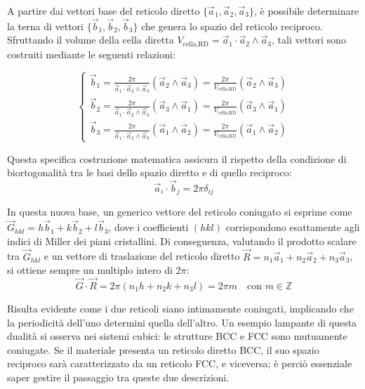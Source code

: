 A partire dai vettori base del reticolo diretto \( \{\vec{a}_1, \vec{a}_2, \vec{a}_3\} \), è possibile determinare la terna di vettori \( \{\vec{b}_1, \vec{b}_2, \vec{b}_3\} \) che genera lo spazio del reticolo reciproco. Sfruttando il volume della cella diretta \( V_{\text{cella,RD}} = \vec{a}_1 \cdot \vec{a}_2 \wedge \vec{a}_3 \), tali vettori sono costruiti mediante le seguenti relazioni:

\begin{equation}
\begin{cases}
    \vec{b}_1 = \frac{2\pi}{\vec{a}_1 \cdot \vec{a}_2 \wedge \vec{a}_3} (\vec{a}_2 \wedge \vec{a}_3) = \frac{2\pi}{V_{\text{cella,RD}}} (\vec{a}_2 \wedge \vec{a}_3) \\
    \vec{b}_2 = \frac{2\pi}{\vec{a}_1 \cdot \vec{a}_2 \wedge \vec{a}_3} (\vec{a}_3 \wedge \vec{a}_1) = \frac{2\pi}{V_{\text{cella,RD}}} (\vec{a}_3 \wedge \vec{a}_1) \\
    \vec{b}_3 = \frac{2\pi}{\vec{a}_1 \cdot \vec{a}_2 \wedge \vec{a}_3} (\vec{a}_1 \wedge \vec{a}_2) = \frac{2\pi}{V_{\text{cella,RD}}} (\vec{a}_1 \wedge \vec{a}_2)
\end{cases}
\end{equation}

Questa specifica costruzione matematica assicura il rispetto della condizione di biortogonalità tra le basi dello spazio diretto e di quello reciproco:
\begin{equation}
    \vec{a}_i \cdot \vec{b}_j = 2\pi\delta_{ij}
\end{equation}

In questa nuova base, un generico vettore del reticolo coniugato si esprime come \( \vec{G}_{hkl} = h\vec{b}_1 + k\vec{b}_2 + l\vec{b}_3 \), dove i coefficienti \( (hkl) \) corrispondono esattamente agli indici di Miller dei piani cristallini. Di conseguenza, valutando il prodotto scalare tra \( \vec{G}_{hkl} \) e un vettore di traslazione del reticolo diretto \( \vec{R} = n_1\vec{a}_1 + n_2\vec{a}_2 + n_3\vec{a}_3 \), si ottiene sempre un multiplo intero di \( 2\pi \):
\begin{equation}
    \vec{G} \cdot \vec{R} = 2\pi(n_1h + n_2k + n_3l) = 2\pi m \quad \text{con } m \in \mathbb{Z}
\end{equation}

Risulta evidente come i due reticoli siano intimamente coniugati, implicando che la periodicità dell'uno determini quella dell'altro. Un esempio lampante di questa dualità si osserva nei sistemi cubici: le strutture BCC e FCC sono mutuamente coniugate. Se il materiale presenta un reticolo diretto BCC, il suo spazio reciproco sarà caratterizzato da un reticolo FCC, e viceversa; è perciò essenziale saper gestire il passaggio tra queste due descrizioni.

